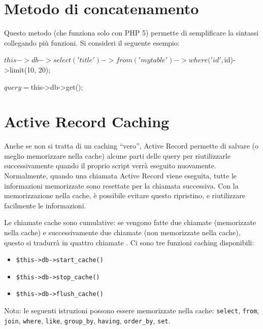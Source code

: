 \section*{Metodo di concatenamento}
Questo metodo (che funziona solo con PHP 5) permette di semplificare la sintassi collegando più funzioni. Si consideri il seguente esempio:

\begin{code}
$this->db->select('title')->from('mytable')->where('id', $id)->limit(10, 20);

$query = $this->db->get();
\end{code}

\section*{Active Record Caching}
Anche se non si tratta di un caching ``vero'', Active Record permette di salvare (o meglio memorizzare nella cache) alcune parti delle query per riutilizzarle successivamente quando il proprio script verrà eseguito nuovamente. Normalmente, quando una chiamata Active Record viene eseguita, tutte le informazioni memorizzate sono resettate per la chiamata successiva. Con la memorizzazione nella cache, è possibile evitare questo ripristino, e riutilizzare facilmente le informazioni.

Le chiamate cache sono cumulative: se vengono fatte due chiamate  (memorizzate nella cache) e successivamente due chiamate  (non memorizzate nella cache), questo si tradurrà in quattro chiamate . Ci sono tre funzioni caching disponibili:

\begin{itemize}
\item \verb|$this->db->start_cache()|

\item \verb|$this->db->stop_cache()|

\item \verb|$this->db->flush_cache()|
\end{itemize}


Nota: le seguenti istruzioni possono essere memorizzate nella cache: \verb|select|, \verb|from|, \verb|join|, \verb|where|, \verb|like|, \verb|group_by|, \verb|having|, \verb|order_by|, \verb|set|.